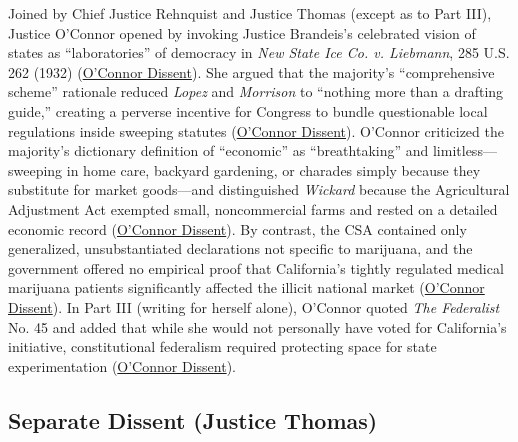 \documentclass[12pt]{article}
\begin{document}
Joined by Chief Justice Rehnquist and Justice Thomas (except as to Part III), Justice O'Connor opened by invoking Justice Brandeis's celebrated vision of states as ``laboratories'' of democracy in \textit{New State Ice Co. v. Liebmann}, 285 U.S. 262 (1932) (\href{https://www.law.cornell.edu/supct/html/03-1454.ZD.html}{O'Connor Dissent}). She argued that the majority's ``comprehensive scheme'' rationale reduced \textit{Lopez} and \textit{Morrison} to ``nothing more than a drafting guide,'' creating a perverse incentive for Congress to bundle questionable local regulations inside sweeping statutes (\href{https://www.law.cornell.edu/supct/html/03-1454.ZD.html}{O'Connor Dissent}). O'Connor criticized the majority's dictionary definition of ``economic'' as ``breathtaking'' and limitless---sweeping in home care, backyard gardening, or charades simply because they substitute for market goods---and distinguished \textit{Wickard} because the Agricultural Adjustment Act exempted small, noncommercial farms and rested on a detailed economic record (\href{https://www.law.cornell.edu/supct/html/03-1454.ZD.html}{O'Connor Dissent}). By contrast, the CSA contained only generalized, unsubstantiated declarations not specific to marijuana, and the government offered no empirical proof that California's tightly regulated medical marijuana patients significantly affected the illicit national market (\href{https://www.law.cornell.edu/supct/html/03-1454.ZD.html}{O'Connor Dissent}). In Part III (writing for herself alone), O'Connor quoted \textit{The Federalist} No. 45 and added that while she would not personally have voted for California's initiative, constitutional federalism required protecting space for state experimentation (\href{https://www.law.cornell.edu/supct/html/03-1454.ZD.html}{O'Connor Dissent}).

\subsection{Separate Dissent (Justice Thomas)}
\end{document}
